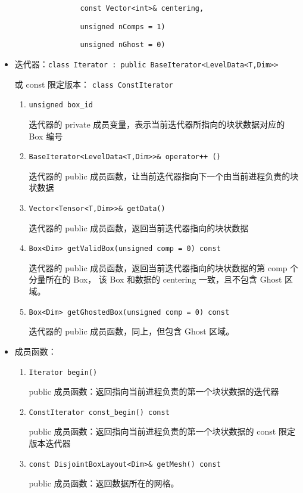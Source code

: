 \documentclass[cn, bibend=bibtex]{elegantpaper}
\theoremstyle{plain}
\begin{document}
\begin{itemize}
\begin{enumerate}
          \lstinline|            const Vector<int>& centering,|

          \lstinline|            unsigned nComps = 1)|
         
          \lstinline|            unsigned nGhost = 0)|
  \end{enumerate}
  \item 迭代器：\lstinline|class Iterator : public BaseIterator<LevelData<T,Dim>>|

  或 const 限定版本： \lstinline|class ConstIterator|
  \begin{enumerate}
    \item \lstinline|unsigned box_id|

    迭代器的 private 成员变量，表示当前迭代器所指向的块状数据对应的 Box 编号
    \item \lstinline|BaseIterator<LevelData<T,Dim>>& operator++ ()|

    迭代器的 public 成员函数，让当前迭代器指向下一个由当前进程负责的块状数据
    \item \lstinline|Vector<Tensor<T,Dim>>& getData()|

    迭代器的 public 成员函数，返回当前迭代器指向的块状数据
    \item \lstinline|Box<Dim> getValidBox(unsigned comp = 0) const|
    
    迭代器的 public 成员函数，返回当前迭代器指向的块状数据的第 comp 个分量所在的 Box，
    该 Box 和数据的 centering 一致，且不包含 Ghost 区域。

    \item \lstinline|Box<Dim> getGhostedBox(unsigned comp = 0) const|
    
    迭代器的 public 成员函数，同上，但包含 Ghost 区域。
  \end{enumerate} 
  \item 成员函数：
  \begin{enumerate}
    \item \lstinline|Iterator begin()|

    public 成员函数：返回指向当前进程负责的第一个块状数据的迭代器

    \item \lstinline|ConstIterator const_begin() const|

    public 成员函数：返回指向当前进程负责的第一个块状数据的 const 限定版本迭代器
    \item \lstinline|const DisjointBoxLayout<Dim>& getMesh() const|

    public 成员函数：返回数据所在的网格。


\end{enumerate}
\end{itemize}
\end{document}
